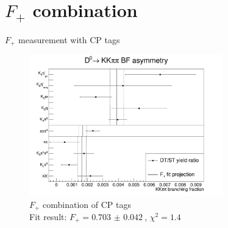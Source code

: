 \documentclass{beamer}
\begin{document}
\section{\texorpdfstring{$F_+$}{F+} combination}

\begin{frame}{$F_+$ measurement with CP tags}
  \begin{figure}
    \centering
    \includegraphics[width=0.75\textwidth]{Plots/CPeven_fraction_combination_CPtags.png}
    \caption{$F_+$ combination of CP tags\\Fit result: $F_+ = \SI{0.703(42)}{}$, $\chi^2 = 1.4$}
  \end{figure}
\end{frame}
\end{document}
